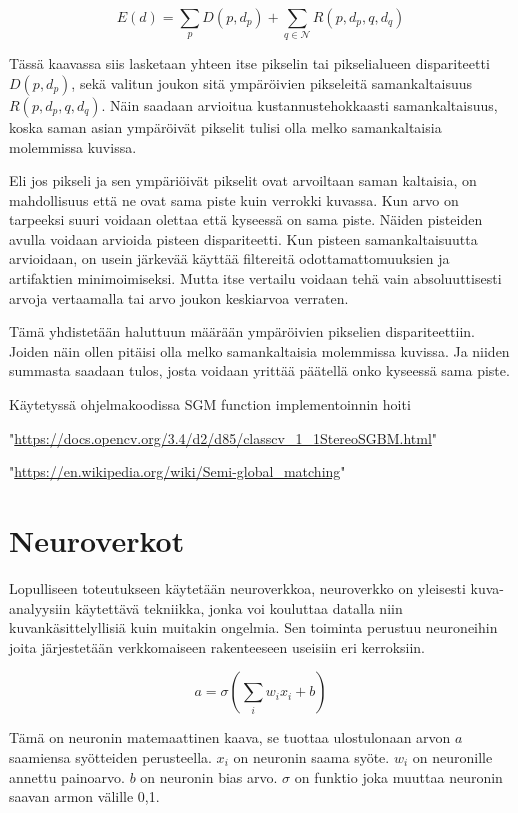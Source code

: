 \begin{equation}\label{yht:SGM}
    E(d) = \sum_{p} D(p, d_p) + \sum_{q \in \mathcal{N}} R(p, d_p, q, d_q)
\end{equation}

Tässä kaavassa siis lasketaan yhteen itse pikselin tai pikselialueen dispariteetti \(D(p, d_p)\), sekä valitun joukon sitä ympäröivien pikseleitä samankaltaisuus\(R(p, d_p, q, d_q)\). Näin saadaan arvioitua kustannustehokkaasti samankaltaisuus, koska saman asian ympäröivät pikselit tulisi olla melko samankaltaisia molemmissa kuvissa. 

Eli jos pikseli ja sen ympäriöivät pikselit ovat arvoiltaan saman kaltaisia, on mahdollisuus että ne ovat sama piste kuin verrokki kuvassa. Kun arvo on tarpeeksi suuri voidaan olettaa että kyseessä on sama piste. Näiden pisteiden avulla voidaan arvioida pisteen dispariteetti. Kun pisteen samankaltaisuutta arvioidaan, on usein järkevää käyttää filtereitä odottamattomuuksien ja artifaktien minimoimiseksi. Mutta itse vertailu voidaan tehä vain absoluuttisesti arvoja vertaamalla tai arvo joukon keskiarvoa verraten.

Tämä yhdistetään haluttuun määrään ympäröivien pikselien dispariteettiin. Joiden näin ollen pitäisi olla melko samankaltaisia molemmissa kuvissa. Ja niiden summasta saadaan tulos, josta voidaan yrittää päätellä onko kyseessä sama piste.

Käytetyssä ohjelmakoodissa SGM function implementoinnin hoiti 

"\url{https://docs.opencv.org/3.4/d2/d85/classcv_1_1StereoSGBM.html}"

"\url{https://en.wikipedia.org/wiki/Semi-global_matching}"

\section{Neuroverkot}

Lopulliseen toteutukseen käytetään neuroverkkoa, neuroverkko on yleisesti kuva-analyysiin käytettävä tekniikka, jonka voi kouluttaa datalla niin kuvankäsittelyllisiä kuin muitakin ongelmia. Sen toiminta perustuu neuroneihin joita järjestetään verkkomaiseen rakenteeseen useisiin eri kerroksiin.

\begin{equation}\label{yht:neuroni}
    a = \sigma\left(\sum_i w_i x_i + b\right)
\end{equation}

Tämä on neuronin matemaattinen kaava, se tuottaa ulostulonaan arvon \(a\)  saamiensa syötteiden perusteella. \(x_i\) on neuronin saama syöte. \(w_i\) on neuronille annettu painoarvo. \(b\) on neuronin bias arvo. \(\sigma\) on funktio joka muuttaa neuronin saavan armon välille 0,1.

